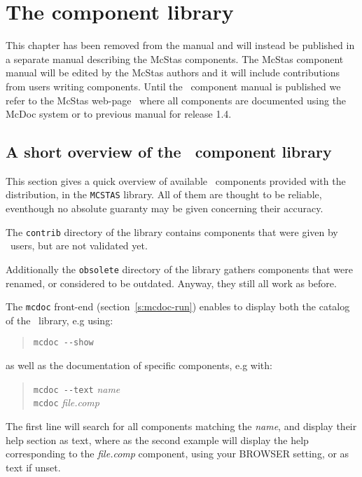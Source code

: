 
\chapter{The component library}
\label{s:components}

This chapter has been removed from the manual and will instead be published 
in a separate manual describing the McStas components. The McStas component manual will be edited by the McStas authors and it will include contributions from users writing components. Until the \MCS\ component manual is published we refer to the McStas web-page~\cite{mcstas_webpage} where all components are documented using the McDoc system or to previous manual for 
release 1.4.

\section{A short overview of the \MCS\ component library}
\label{s:comp-overview}

This section gives a quick overview of available \MCS\ components provided with the distribution, in the \verb+MCSTAS+ library. All of them are thought to be reliable, eventhough no absolute guaranty may be given concerning their accuracy.

The \verb+contrib+ directory of the library contains components that were given by \MCS\ users, but are not validated yet. 

Additionally the \verb+obsolete+ directory of the library gathers components that were renamed, or considered to be outdated. Anyway, they still all work as before.

The \verb+mcdoc+ front-end (section~\ref{s:mcdoc-run}) enables to display both the 
catalog of the \MCS\ library, e.g using: 
\begin{quote}
  \verb|mcdoc --show|
\end{quote}
as well as the documentation of specific components, e.g with:
\begin{quote}
  \verb|mcdoc --text| {\it name} \\
  \verb|mcdoc| {\it file.comp}
\end{quote}
The first line will search for all components matching the {\it name}, and display their help section as text, where as the second example will display the help corresponding to the {\it file.comp} component, using your BROWSER setting, or as text if unset.

